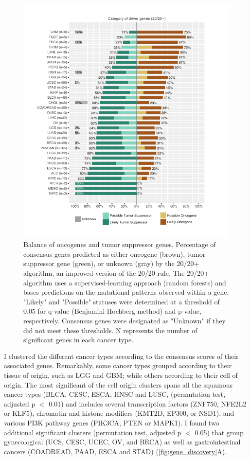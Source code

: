 \begin{figure}
  \centering
  \makeatletter
  \let\@currsize\normalsize
  \includegraphics[width=0.9\linewidth]{figures/chapter7/og_tsg_balance.pdf}
  \caption[Balance of oncogenes and tumor suppressor genes.]{Balance of oncogenes and tumor suppressor genes. Percentage of consensus genes predicted as either oncogene (brown), tumor suppressor gene (green), or unknown (gray) by the 20/20+ algorithm, an improved version of the 20/20 rule. The 20/20+ algorithm uses a supervised-learning approach (random forests) and bases predictions on the mutational patterns observed within a gene. "Likely" and "Possible" statuses were determined at a threshold of 0.05 for q-value (Benjamini-Hochberg method) and p-value, respectively. Consensus genes were designated as "Unknown" if they did not meet these thresholds. N represents the number of significant genes in each cancer type.}
  \label{fig:og_tsg_balance}
\end{figure}

I clustered the different cancer types according to the consensus scores of their associated genes. Remarkably, some cancer types grouped according to their tissue of origin, such as LGG and GBM; while others according to their cell of origin. The most significant of the cell origin clusters spans all the squamous cancer types (BLCA, CESC, ESCA, HNSC and LUSC, (permutation test, adjusted p $<$ 0.01) and includes several transcription factors (ZNF750, NFE2L2 or KLF5), chromatin and histone modifiers (KMT2D, EP300, or NSD1), and various PI3K pathway genes (PIK3CA, PTEN or MAPK1). I found two additional significant clusters (permutation test, adjusted p $<$ 0.05) that group gynecological (UCS, CESC, UCEC, OV, and BRCA) as well as gastrointestinal cancers (COADREAD, PAAD, ESCA and STAD) (\autoref{fig:gene_discovery}A). 

